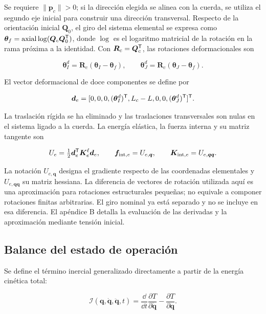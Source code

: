 Se requiere $\|\bm p_c\|>0$; si la dirección elegida se alinea con la cuerda, se utiliza el segundo eje inicial para construir una dirección transversal. Respecto de la orientación inicial $\bm Q_0$, el giro del sistema elemental se expresa como $\bm\theta_f=\operatorname{axial}\log(\bm Q_c\bm Q_0^\mathsf T)$, donde $\log$ es el logaritmo matricial de la rotación en la rama próxima a la identidad. Con $\bm R_c=\bm Q_c^\mathsf T$, las rotaciones deformacionales son

\begin{equation}
\bm\theta_I^d=\bm R_c(\bm\theta_I-\bm\theta_f),\qquad
\bm\theta_J^d=\bm R_c(\bm\theta_J-\bm\theta_f).
\end{equation}

El vector deformacional de doce componentes se define por

\begin{equation}
\bm d_e=[0,0,0,(\bm\theta_I^d)^\mathsf T,L_c-L,0,0,
(\bm\theta_J^d)^\mathsf T]^\mathsf T.
\end{equation}

La traslación rígida se ha eliminado y las traslaciones transversales son nulas en el sistema ligado a la cuerda. La energía elástica, la fuerza interna y su matriz tangente son

\begin{equation}
U_e=\tfrac12\bm d_e^\mathsf T\bm K_e^\ell\bm d_e,\qquad
\bm f_{{\rm int},e}=U_{e,\bm q},\qquad
\bm K_{{\rm int},e}=U_{e,\bm q\bm q}.
\label{eq:corot}
\end{equation}

La notación $U_{e,\bm q}$ designa el gradiente respecto de las coordenadas elementales y $U_{e,\bm q\bm q}$ su matriz hessiana. La diferencia de vectores de rotación utilizada aquí es una aproximación para rotaciones estructurales pequeñas; no equivale a componer rotaciones finitas arbitrarias. El giro nominal ya está separado y no se incluye en esa diferencia. El apéndice B detalla la evaluación de las derivadas y la aproximación mediante tensión inicial.

\subsection{Balance del estado de operación}
Se define el término inercial generalizado directamente a partir de la energía cinética total:

\begin{equation}
\bm{\mathcal I}(\bm q,\dot{\bm q},\ddot{\bm q},t)
=\frac{\dd}{\dd t}\frac{\partial T}{\partial\dot{\bm q}}
-\frac{\partial T}{\partial\bm q}.
\label{eq:inercia-generalizada}
\end{equation}

